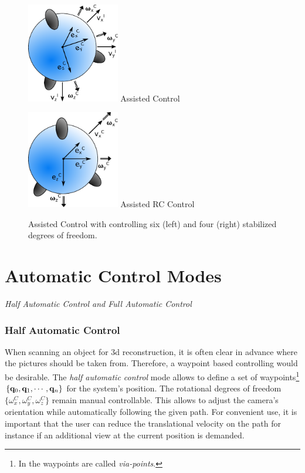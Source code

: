 \begin{figure}[H]		
	\small{
		\begin{center}
			\parbox{0.36\textwidth}{\centering \includegraphics[width=0.36\textwidth]{AC}
			 Assisted Control}
			\hspace{0.1\textwidth}			
			\parbox{0.36\textwidth}{\centering \includegraphics[width=0.36\textwidth]{RC}
			Assisted RC Control}
	\caption[Assisted Control]{Assisted Control with controlling six (left) and four (right) stabilized degrees of freedom.}
		\label{fig:assisted_control}
		\end{center}
	}			
	\vspace{4.5mm}
\end{figure}

\section{Automatic Control Modes}
\label{sec:automaticControlModes}
\textit{Half Automatic Control and Full Automatic Control}

\subsubsection{Half Automatic Control}
When scanning an object for 3d reconstruction, it is often clear in advance where the pictures should be taken from. Therefore, a waypoint based controlling would be desirable. The \textit{half automatic control} mode allows to define a set of waypoints\footnote{In \cite{biagiotti} the waypoints are called \textit{via-points}.} $\{{\bf q}_0, {\bf q}_1, \cdots, {\bf q}_n\}$ for the system's position. The rotational degrees of freedom $\{\omega_x^C, \omega_y^C, \omega_z^C\}$ remain manual controllable. This allows to adjust the camera's orientation while automatically following the given path. For convenient use, it is important that the user can reduce the translational velocity on the path for instance if an additional view at the current position is demanded.

